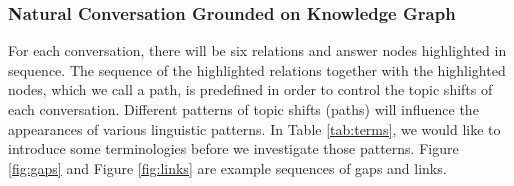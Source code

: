 \documentclass[bsc,frontabs,twoside,singlespacing,parskip,deptreport]{infthesis}     %
\begin{document}
\subsubsection*{Natural Conversation Grounded on Knowledge Graph}

For each conversation, there will be six relations and answer nodes highlighted in sequence. The sequence of the highlighted relations together with the highlighted nodes, which we call a path, is predefined in order to control the topic shifts of each conversation. Different patterns of topic shifts (paths) will influence the appearances of various linguistic patterns. In Table \ref{tab:terms}, we would like to introduce some terminologies before we investigate those patterns. Figure \ref{fig:gaps} and Figure \ref{fig:links} are example sequences of gaps and links.

\begin{table}[]
\centering
{}
\caption{Definition for Graph Annotations.}
\label{tab:terms}
\end{table}
\end{document}
